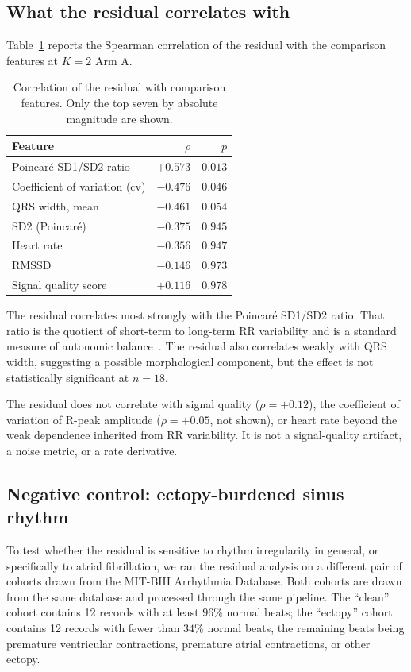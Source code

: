 \documentclass[11pt]{article}
\begin{document}
\subsection{What the residual correlates with}

Table~\ref{tab:correlations} reports the Spearman correlation of the
residual with the comparison features at $K = 2$ Arm A.

\begin{table}[h]
\centering
\begin{tabular}{lrr}
\toprule
Feature & $\rho$ & $p$ \\
\midrule
Poincar\'e SD1/SD2 ratio & $+0.573$ & $0.013$ \\
Coefficient of variation (cv) & $-0.476$ & $0.046$ \\
QRS width, mean & $-0.461$ & $0.054$ \\
SD2 (Poincar\'e) & $-0.375$ & $0.945$ \\
Heart rate & $-0.356$ & $0.947$ \\
RMSSD & $-0.146$ & $0.973$ \\
Signal quality score & $+0.116$ & $0.978$ \\
\bottomrule
\end{tabular}
\caption{Correlation of the residual with comparison features. Only the
top seven by absolute magnitude are shown.}
\label{tab:correlations}
\end{table}

The residual correlates most strongly with the Poincar\'e SD1/SD2
ratio. That ratio is the quotient of short-term to long-term RR
variability and is a standard measure of autonomic
balance~\cite{brennan2001}. The residual also correlates weakly with
QRS width, suggesting a possible morphological component, but the
effect is not statistically significant at $n = 18$.

The residual does not correlate with signal quality ($\rho = +0.12$),
the coefficient of variation of R-peak amplitude ($\rho = +0.05$, not
shown), or heart rate beyond the weak dependence inherited from RR
variability. It is not a signal-quality artifact, a noise metric, or a
rate derivative.

\subsection{Negative control: ectopy-burdened sinus rhythm}

To test whether the residual is sensitive to rhythm irregularity in
general, or specifically to atrial fibrillation, we ran the residual
analysis on a different pair of cohorts drawn from the MIT-BIH
Arrhythmia Database. Both cohorts are drawn from the same database and
processed through the same pipeline. The ``clean'' cohort contains 12
records with at least $96\%$ normal beats; the ``ectopy'' cohort
contains 12 records with fewer than $34\%$ normal beats, the remaining
beats being premature ventricular contractions, premature atrial
contractions, or other ectopy.
\end{document}
